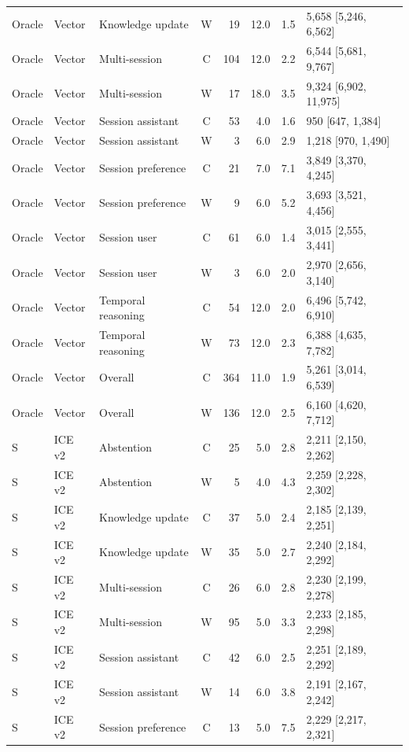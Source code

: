 \documentclass[twoside,11pt]{article}
\begin{document}
\begin{longtable}{@{}L{1.0cm}L{1.0cm}L{2.6cm}crrrL{3.6cm}@{}}
Oracle & Vector & Knowledge update & W & 19 & 12.0 & 1.5 & 5,658 [5,246, 6,562] \\
Oracle & Vector & Multi-session & C & 104 & 12.0 & 2.2 & 6,544 [5,681, 9,767] \\
Oracle & Vector & Multi-session & W & 17 & 18.0 & 3.5 & 9,324 [6,902, 11,975] \\
Oracle & Vector & Session assistant & C & 53 & 4.0 & 1.6 & 950 [647, 1,384] \\
Oracle & Vector & Session assistant & W & 3 & 6.0 & 2.9 & 1,218 [970, 1,490] \\
Oracle & Vector & Session preference & C & 21 & 7.0 & 7.1 & 3,849 [3,370, 4,245] \\
Oracle & Vector & Session preference & W & 9 & 6.0 & 5.2 & 3,693 [3,521, 4,456] \\
Oracle & Vector & Session user & C & 61 & 6.0 & 1.4 & 3,015 [2,555, 3,441] \\
Oracle & Vector & Session user & W & 3 & 6.0 & 2.0 & 2,970 [2,656, 3,140] \\
Oracle & Vector & Temporal reasoning & C & 54 & 12.0 & 2.0 & 6,496 [5,742, 6,910] \\
Oracle & Vector & Temporal reasoning & W & 73 & 12.0 & 2.3 & 6,388 [4,635, 7,782] \\
Oracle & Vector & Overall & C & 364 & 11.0 & 1.9 & 5,261 [3,014, 6,539] \\
Oracle & Vector & Overall & W & 136 & 12.0 & 2.5 & 6,160 [4,620, 7,712] \\
S & ICE v2 & Abstention & C & 25 & 5.0 & 2.8 & 2,211 [2,150, 2,262] \\
S & ICE v2 & Abstention & W & 5 & 4.0 & 4.3 & 2,259 [2,228, 2,302] \\
S & ICE v2 & Knowledge update & C & 37 & 5.0 & 2.4 & 2,185 [2,139, 2,251] \\
S & ICE v2 & Knowledge update & W & 35 & 5.0 & 2.7 & 2,240 [2,184, 2,292] \\
S & ICE v2 & Multi-session & C & 26 & 6.0 & 2.8 & 2,230 [2,199, 2,278] \\
S & ICE v2 & Multi-session & W & 95 & 5.0 & 3.3 & 2,233 [2,185, 2,298] \\
S & ICE v2 & Session assistant & C & 42 & 6.0 & 2.5 & 2,251 [2,189, 2,292] \\
S & ICE v2 & Session assistant & W & 14 & 6.0 & 3.8 & 2,191 [2,167, 2,242] \\
S & ICE v2 & Session preference & C & 13 & 5.0 & 7.5 & 2,229 [2,217, 2,321] \\

\end{longtable}
\end{document}
